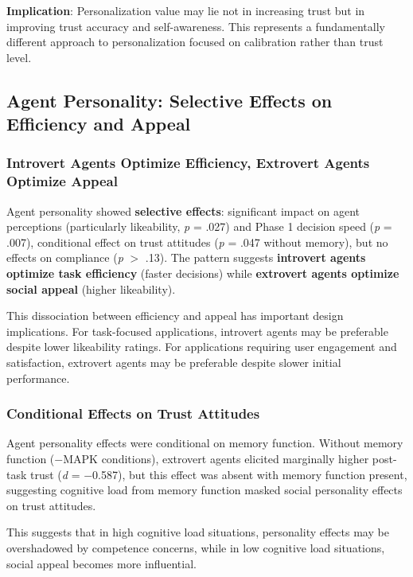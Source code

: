 \documentclass[12pt]{article}
\begin{document}
\textbf{Implication}: Personalization value may lie not in increasing trust but in improving trust accuracy and self-awareness. This represents a fundamentally different approach to personalization focused on calibration rather than trust level.

\subsection{Agent Personality: Selective Effects on Efficiency and Appeal}

\subsubsection{Introvert Agents Optimize Efficiency, Extrovert Agents Optimize Appeal}

Agent personality showed \textbf{selective effects}: significant impact on agent perceptions (particularly likeability, \textit{p} = .027) and Phase 1 decision speed (\textit{p} = .007), conditional effect on trust attitudes (\textit{p} = .047 without memory), but no effects on compliance (\textit{p} $>$ .13). The pattern suggests \textbf{introvert agents optimize task efficiency} (faster decisions) while \textbf{extrovert agents optimize social appeal} (higher likeability).

This dissociation between efficiency and appeal has important design implications. For task-focused applications, introvert agents may be preferable despite lower likeability ratings. For applications requiring user engagement and satisfaction, extrovert agents may be preferable despite slower initial performance.

\subsubsection{Conditional Effects on Trust Attitudes}

Agent personality effects were conditional on memory function. Without memory function ($-$MAPK conditions), extrovert agents elicited marginally higher post-task trust (\textit{d} = $-$0.587), but this effect was absent with memory function present, suggesting cognitive load from memory function masked social personality effects on trust attitudes.

This suggests that in high cognitive load situations, personality effects may be overshadowed by competence concerns, while in low cognitive load situations, social appeal becomes more influential.
\end{document}
